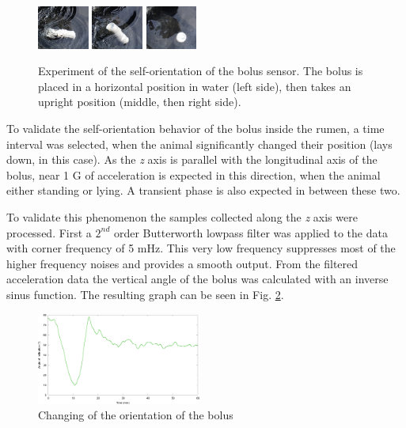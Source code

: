 \documentclass[conference]{IEEEtran}
\begin{document}
\begin{figure}[htbp]
  \centerline{
    \includegraphics[width=0.15\textwidth]{fig/kfj_1.png}
    \includegraphics[width=0.15\textwidth]{fig/kfj_2.png}
    \includegraphics[width=0.15\textwidth]{fig/kfj_3.png}
  }
  \caption{Experiment of the self-orientation of the bolus sensor. The
  bolus is placed in a horizontal position in water (left side), then takes
  an upright position (middle, then right side).}
  \label{self-orientation-experiment}
\end{figure}

To validate the self-orientation behavior of the bolus inside the rumen, a time
interval was selected, when the animal significantly changed their position
(lays down, in this case). As the \emph{z} axis is parallel with the
longitudinal axis of the bolus, near 1 G of acceleration is expected in this
direction, when the animal either standing or lying. A transient
phase is also expected in between these two.

To validate this phenomenon the samples collected along the \emph{z} axis were
processed. First a $2^{nd}$ order Butterworth lowpass filter was applied to the
data with corner frequency of 5 mHz. This very low frequency suppresses most of
the higher frequency noises and provides a smooth output. From the filtered
acceleration data the vertical angle of the bolus was calculated with an
inverse sinus function. The resulting graph can be seen in Fig.
\ref{auto-orientation}.

\begin{figure}[htbp]
\centerline{\includegraphics[width=0.48\textwidth]{fig/auto-orientation.png}}
  \caption{Changing of the orientation of the bolus}
\label{auto-orientation}
\end{figure}
\end{document}
